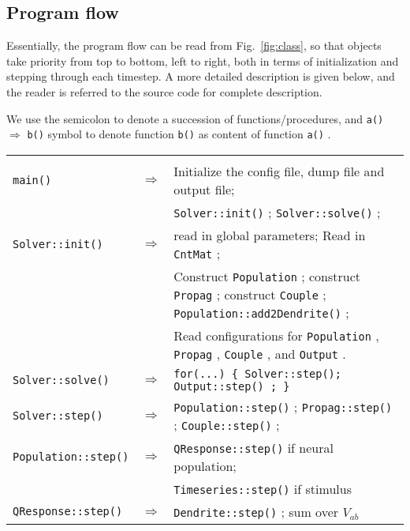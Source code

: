 \documentclass[12pt,a4paper]{article}
\newcommand{\type}[1]{ {\small\small\tt #1} }
\begin{document}
\subsection{Program flow}

Essentially, the program flow can be read from Fig.~\ref{fig:class}, so that objects take priority from top to bottom, left to right, both in terms of initialization and stepping through each timestep. A more detailed description is given below, and the reader is referred to the source code for complete description.

We use the semicolon to denote a succession of functions/procedures, and \type{a()} $\Rightarrow$ \type{b()} symbol to denote function \type{b()} as content of function \type{a()}.

\begin{center}
\begin{tabular}{ | l l p{11cm} | }
\hline \\

\type{main()}& $\Rightarrow$ &Initialize the config file, dump file and output file;\\[6pt]
&&\type{Solver::init()};\type{Solver::solve()};\\[6pt]
\type{Solver::init()}& $\Rightarrow$ &read in global parameters; Read in \type{CntMat};\\[6pt]
&&Construct \type{Population}; construct \type{Propag}; construct \type{Couple}; \type{Population::add2Dendrite()};\\[6pt]
&&Read configurations for \type{Population}, \type{Propag}, \type{Couple}, and \type{Output}.\\[6pt]
\type{Solver::solve()}& $\Rightarrow$ & \type{for(...) \{ Solver::step(); \type{Output::step()}; \} }\\[6pt]
\type{Solver::step()}& $\Rightarrow$ & \type{Population::step()}; \type{Propag::step()}; \type{Couple::step()};\\[6pt]
\type{Population::step()}& $\Rightarrow$ & \type{QResponse::step()} if neural population;\\[6pt]
&&\type{Timeseries::step()} if stimulus\\[6pt]
\type{QResponse::step()}& $\Rightarrow$ & \type{Dendrite::step()}; sum over \(V_{ab}\)

\\\hline
\end{tabular}
\end{center}
\end{document}
